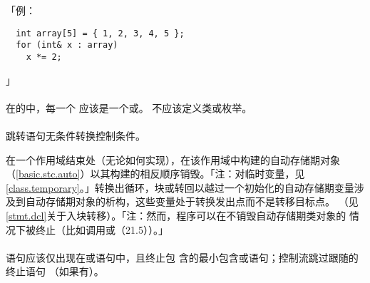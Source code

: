 「例：
\begin{lstlisting}
  int array[5] = { 1, 2, 3, 4, 5 };
  for (int& x : array)
    x *= 2;
\end{lstlisting}」

\paragraph{}
在的中，每一个
应该是一个或。
不应该定义类或枚举。

\paragraph{}
跳转语句无条件转换控制条件。


在一个作用域结束处（无论如何实现），在该作用域中构建的自动存储期对象
（\ref{basic.stc.auto}）以其构建的相反顺序销毁。「注：对临时变量，见
\ref{class.temporary}。」转换出循环，块或转回以越过一个初始化的自动存储期变量涉
及到自动存储期对象的析构，这些变量处于转换发出点而不是转移目标点。
（见\ref{stmt.dcl}关于入块转移）。「注：然而，程序可以在不销毁自动存储期类对象的
情况下被终止（比如调用或（21.5））。」

\paragraph{}
语句应该仅出现在或语句中，且终止包
含的最小包含或语句；控制流跳过跟随的终止语句
（如果有）。


